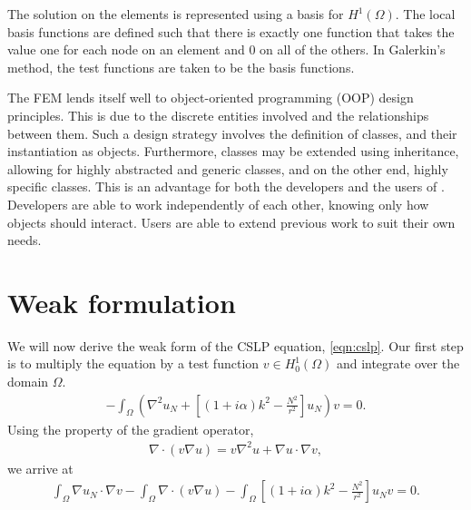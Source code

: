 The solution on the elements is represented using a basis for $H^1(\Omega)$.
The local basis functions are defined such that there is exactly one function that takes the value one for each node on an element and 0 on all of the others.
In Galerkin's method, the test functions are taken to be the basis functions. 

The FEM lends itself well to object-oriented programming (OOP) design principles.
This is due to the discrete entities involved and the relationships between them.
Such a design strategy involves the definition of classes, and their instantiation as objects.
Furthermore, classes may be extended using inheritance, allowing for highly abstracted and generic classes, and on the other end, highly specific classes.
This is an advantage for both the developers and the users of \oomph.
Developers are able to work independently of each other, knowing only how objects should interact.
Users are able to extend previous work to suit their own needs.







\section{Weak formulation}

We will now derive the weak form of the CSLP equation, \eqref{eqn:cslp}.
Our first step is to multiply the equation by a test function $v\in H^1_0(\Omega)$ and integrate over the domain $\Omega$.
\begin{align}
	-\int_\Omega \left(\nabla^2 u_N + \left[ (1+i\alpha)k^2-\frac{N^2}{r^2}\right]u_N \right) v = 0.
\end{align}
Using the property of the gradient operator,
\begin{align}
	\nabla \cdot ( v \nabla u) = v \nabla^2 u + \nabla u \cdot \nabla v,
\end{align}
we arrive at
\begin{align}
	\int_\Omega \nabla u_N \cdot \nabla v 
  - \int_\Omega \nabla \cdot (v \nabla u ) 
  - \int_\Omega \left[(1+i\alpha)k^2 - \frac{N^2}{r^2}\right] u_N v = 0.
\end{align}

